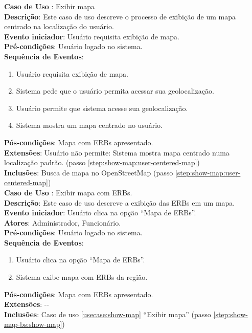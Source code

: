 \documentclass[]{politex}
\begin{document}
\noindent \textbf{Caso de Uso }: Exibir mapa \\
\textbf{Descrição}: Este caso de uso descreve o processo de exibição de um mapa centrado na localização do usuário. \\
\textbf{Evento iniciador}: Usuário requisita exibição de mapa. \\
\textbf{Pré-condições}: Usuário logado no sistema. \\
\textbf{Sequência de Eventos}:
\begin{enumerate}
\item Usuário requisita exibição de mapa.
\item Sistema pede que o usuário permita acessar sua geolocalização.
\item Usuário permite que sistema acesse sua geolocalização.
\item\label{step:show-map:user-centered-map} Sistema mostra um mapa centrado no usuário.
\end{enumerate}
\textbf{Pós-condições}: Mapa com ERBs apresentado. \\
\textbf{Extensões}: Usuário não permite: Sistema mostra mapa centrado numa localização padrão. (passo \ref{step:show-map:user-centered-map}) \\
\textbf{Inclusões}: Busca de mapa no OpenStreetMap (passo \ref{step:show-map:user-centered-map}) \\

\noindent \textbf{Caso de Uso }: Exibir mapa com ERBs. \\
\textbf{Descrição}: Este caso de uso descreve a exibição das ERBs em um mapa. \\
\textbf{Evento iniciador}: Usuário clica na opção ``Mapa de ERBs''. \\
\textbf{Atores}: Administrador, Funcionário. \\
\textbf{Pré-condições}: Usuário logado no sistema. \\
\textbf{Sequência de Eventos}:
\begin{enumerate}
\item Usuário clica na opção ``Mapa de ERBs''.
\item\label{step:show-map-bs:show-map} Sistema exibe mapa com ERBs da região.
\end{enumerate}
\textbf{Pós-condições}: Mapa com ERBs apresentado. \\
\textbf{Extensões}: -{}- \\
\textbf{Inclusões}: Caso de uso \ref{usecase:show-map} ``Exibir mapa'' (passo \ref{step:show-map-bs:show-map}) \\
\end{document}
